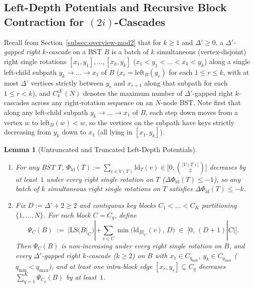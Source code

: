 \documentclass[11pt]{article}
\newtheorem{lemma}[theorem]{Lemma}
\theoremstyle{definition}
\theoremstyle{remark}
\newcommand{\LS}{\mathrm{LS}}
\newcommand{\ld}{\mathrm{ld}}
\begin{document}
\subsection{Left-Depth Potentials and Recursive Block Contraction for \texorpdfstring{$(2i)$}{(2i)}-Cascades}
\label{subsec:cascade-2i}

Recall from Section~\ref{subsec:overview-mod2} that for $k \ge 1$ and $\Delta' \ge 0$, a \emph{$\Delta'$-gapped right $k$-cascade} on a BST $B$ is a batch of $k$ simultaneous (vertex-disjoint) right single rotations $[x_1, y_1], \dots, [x_k, y_k]$ ($x_1 < y_1 < \dots < x_k < y_k$) along a single left-child subpath $y_k \to \dots \to x_1$ of $B$ ($x_r = \mathrm{left}_B(y_r)$ for each $1 \le r \le k$, with at most $\Delta'$ vertices strictly between $y_r$ and $x_{r+1}$ along that subpath for each $1 \le r < k$), and $C^{\Delta'}_k(N)$ denotes the maximum number of $\Delta'$-gapped right $k$-cascades across any right-rotation sequence on an $N$-node BST. Note first that along any left-child subpath $y_k \to \dots \to x_1$ of $B$, each step down moves from a vertex $w$ to $\mathrm{left}_B(w) < w$, so the vertices on the subpath have keys strictly decreasing from $y_k$ down to $x_1$ (all lying in $[x_1, y_k]$).

\begin{lemma}[Untruncated and Truncated Left-Depth Potentials]
\label{lem:cascade-potentials}
\leavevmode
\begin{enumerate}[label=(\arabic*)]
  \item For any BST $T$, $\Phi_{\ld}(T) := \sum_{v \in V(T)} \ld_T(v) \in \big[0, \binom{|V(T)|}{2}\big]$ decreases by at least~$1$ under every right single rotation on $T$ ($\Delta\Phi_{\ld}(T) \le -1$), so any batch of $k$ simultaneous right single rotations on $T$ satisfies $\Delta\Phi_{\ld}(T) \le -k$.
  \item Fix $D := \Delta' + 2 \ge 2$ and contiguous key blocks $C_1 < \dots < C_K$ partitioning $\{1, \dots, N\}$. For each block $C = C_q$, define
  \[
  \Psi_C(B) \;:=\; |\LS(B|_C)| + \sum_{v \in C} \min\big(\ld_{B|_C}(v),\, D\big) \;\in\; \big[0,\, (D + 1)|C|\big].
  \]
  Then $\Psi_C(B)$ is non-increasing under every right single rotation on $B$, and every $\Delta'$-gapped right $k$-cascade ($k \ge 2$) on $B$ with $x_1 \in C_{q_{\min}}$, $y_k \in C_{q_{\max}}$ ($q_{\min} < q_{\max}$), and at least one intra-block edge $[x_r, y_r] \subseteq C_q$ decreases $\sum_{q=1}^K \Psi_{C_q}(B)$ by at least~$1$.
\end{enumerate}
\end{lemma}
\end{document}
